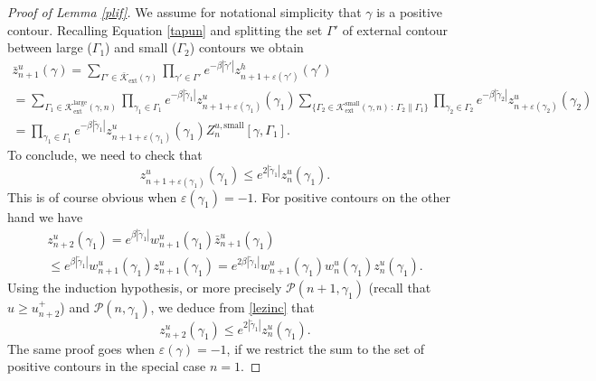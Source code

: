 \documentclass[10pt]{amsart}
\let\mathcal\mathscr
\newcommand{\sep}{\,:\,}
\numberwithin{equation}{section}
\theoremstyle{plain}
\theoremstyle{definition}
\newcommand{\ext}{\mathrm{ext}}
\newcommand{\sm}{\mathrm{small}}
\newcommand{\larg}{\mathrm{large}}
\newcommand{\cP}{{\ensuremath{\mathcal P}} }
\newcommand{\cK}{{\ensuremath{\mathcal K}} }
\newcommand{\gb}{\beta}
\newcommand{\gep}{\varepsilon}
\newcommand{\gG}{\Gamma}
\begin{document}
\begin{proof}[Proof of Lemma \ref{plif}]
We assume for notational simplicity that $\gamma$ is a positive contour.
Recalling Equation \eqref{tapun} and splitting the set $\gG'$ of external contour between large ($\gG_1$) and small ($\gG_2$) contours we obtain
\begin{multline*}
\bar z^{u}_{n+1}(\gamma)= \sum_{\gG'\in \bar \cK_{\ext}(\gamma)}\prod_{\gamma'\in \gG'} e^{-\gb |\tilde \gamma'|} z^h_{n+1+\gep(\gamma')}(\gamma') \\
=
\!\!\!\!\!\sum_{\gG_1\in \cK^{\larg}_{\ext}(\gamma,n)}
\prod_{\gamma_1\in \gG_1} e^{-\gb |\tilde \gamma_1|} z^u_{n+1+\gep(\gamma_1)}(\gamma_1) \!\!\!\!\!\!\!\!
\sum_{\{ \gG_2 \in \cK^{\sm}_{\ext}(\gamma,n) \sep \gG_2 \parallel \gG_1\}} \prod_{\gamma_2\in \gG_2 } e^{-\gb |\tilde\gamma_2|} z^u_{n+\gep(\gamma_2)}(\gamma_2)\\
= \prod_{\gamma_1\in \gG_1} e^{-\gb |\tilde \gamma_1|} z^u_{n+1+\gep(\gamma_1)}(\gamma_1) Z^{u,\sm}_{n}[\gamma, \gG_1].
\end{multline*}
To conclude, we need to check that
\begin{equation*}
z^u_{n+1+\gep(\gamma_1)}(\gamma_1)\le e^{2|\tilde \gamma_1|}z^u_{n}(\gamma_1).
\end{equation*}
This is of course obvious when $\gep(\gamma_1)=-1$. For positive contours on the other hand we have
\begin{multline}\label{lezinc}
z^u_{n+2}(\gamma_1)= e^{\gb | \tilde \gamma_1|}w^u_{n+1}(\gamma_1) \bar z^u_{n+1}(\gamma_1)\\
\le
e^{\gb | \tilde \gamma_1|}w^u_{n+1}(\gamma_1) z^u_{n+1}(\gamma_1)= e^{2\gb | \tilde \gamma_1|}w^u_{n+1}(\gamma_1) w^u_{n}(\gamma_1) z^u_{n}(\gamma_1).
\end{multline}
Using the induction hypothesis, or more precisely $\cP(n+1,\gamma_1)$ (recall that $u\ge u^+_{n+2}$) and $\cP(n,\gamma_1)$, we deduce from \eqref{lezinc} that
\begin{equation*}
z^u_{n+2}(\gamma_1)\le e^{2|\tilde \gamma_1|}z^u_{n}(\gamma_1).
\end{equation*}
The same proof goes when $\gep(\gamma)=-1$, if we restrict the sum to the set of positive contours in the special case $n=1$.
\end{proof}
\end{document}
